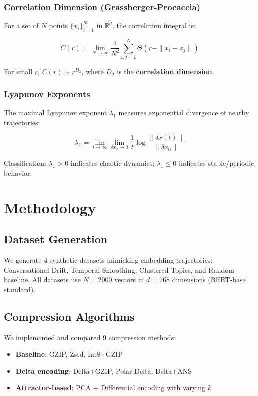 \documentclass[utf8]{FrontiersinVancouver}
\begin{document}
\subsubsection{Correlation Dimension (Grassberger-Procaccia)}

For a set of $N$ points $\{x_i\}_{i=1}^N$ in $\mathbb{R}^d$, the correlation integral is:

\begin{equation}
C(r) = \lim_{N \to \infty} \frac{1}{N^2} \sum_{i,j=1}^N \Theta(r - \|x_i - x_j\|)
\end{equation}

For small $r$, $C(r) \sim r^{D_2}$, where $D_2$ is the \textbf{correlation dimension}.

\subsubsection{Lyapunov Exponents}

The maximal Lyapunov exponent $\lambda_1$ measures exponential divergence of nearby trajectories:

\begin{equation}
\lambda_1 = \lim_{t \to \infty} \lim_{\delta x_0 \to 0} \frac{1}{t} \log \frac{\|\delta x(t)\|}{\|\delta x_0\|}
\end{equation}

Classification: $\lambda_1 > 0$ indicates chaotic dynamics; $\lambda_1 \leq 0$ indicates stable/periodic behavior.

\section{Methodology}

\subsection{Dataset Generation}

We generate 4 synthetic datasets mimicking embedding trajectories: Conversational Drift, Temporal Smoothing, Clustered Topics, and Random baseline. All datasets use $N = 2000$ vectors in $d = 768$ dimensions (BERT-base standard).

\subsection{Compression Algorithms}

We implemented and compared 9 compression methods:
\begin{itemize}
\item \textbf{Baseline}: GZIP, Zstd, Int8+GZIP
\item \textbf{Delta encoding}: Delta+GZIP, Polar Delta, Delta+ANS
\item \textbf{Attractor-based}: PCA + Differential encoding with varying $k$
\end{itemize}
\end{document}
